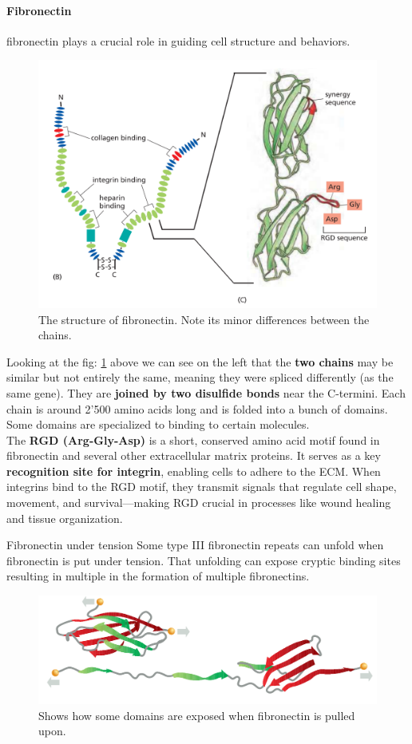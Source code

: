\documentclass[../main.tex]{subfiles}
\begin{document}
\paragraph{Fibronectin}
\gls{fibronectin} plays a crucial role in guiding cell structure and behaviors.

\begin{figure}[H]
	\centering
	\includegraphics[width=0.6\linewidth]{fibr_struc}
	\caption{The structure of fibronectin. Note its minor differences between the chains.}
	\label{fig:fibrstruc}
\end{figure}

Looking at the fig: \ref{fig:fibrstruc} above we can see on the left that the \textbf{two chains} may be similar but not entirely the same, meaning they were spliced differently (as the same gene). They are \textbf{joined by two disulfide bonds} near the C-termini. Each chain is around 2'500 amino acids long and is folded into a bunch of domains. Some domains are specialized to binding to certain molecules. \\
The \textbf{\gls{RGD} (Arg-Gly-Asp)} is a short, conserved amino acid motif found in fibronectin and several other extracellular matrix proteins. It serves as a key \textbf{recognition site for \gls{integrin}}, enabling cells to adhere to the ECM. When integrins bind to the RGD motif, they transmit signals that regulate cell shape, movement, and survival—making RGD crucial in processes like wound healing and tissue organization.

\begin{RemarkWithTitel}{Fibronectin under tension}
	Some type III fibronectin repeats can unfold when fibronectin is put under tension. That unfolding can expose cryptic binding sites resulting in multiple in the formation of multiple fibronectins.
\end{RemarkWithTitel}

\begin{figure}
	\centering
	\includegraphics[width=0.4\linewidth]{fibr_tens}
	\caption{Shows how some domains are exposed when fibronectin is pulled upon.}
	\label{fig:fibrtens}
\end{figure}
\end{document}
